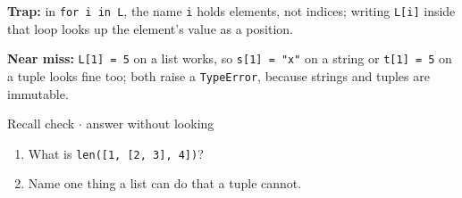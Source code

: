 \documentclass[11pt]{article}
\begin{document}
\begin{keepsection}
\begin{notebox}\textbf{Trap:} in \texttt{for i in L}, the name \texttt{i} holds elements, not indices; writing \texttt{L[i]} inside that loop looks up the element’s value as a position.\end{notebox}

\begin{notebox}\textbf{Near miss:} \texttt{L[1] = 5} on a list works, so \texttt{s[1] = "x"} on a string or \texttt{t[1] = 5} on a tuple looks fine too; both raise a \texttt{TypeError}, because strings and tuples are immutable.\end{notebox}

\begin{recallbox}{Recall check \ensuremath{\cdot} answer without looking}
\begin{enumerate}
\item What is \texttt{len([1, [2, 3], 4])}?
\item Name one thing a list can do that a tuple cannot.
\end{enumerate}

\end{recallbox}
\end{keepsection}
\end{document}

